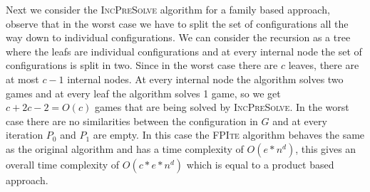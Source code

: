 Next we consider the \textsc{IncPreSolve} algorithm for a family based approach, observe that in the worst case we have to split the set of configurations all the way down to individual configurations. We can consider the recursion as a tree where the leafs are individual configurations and at every internal node the set of configurations is split in two. Since in the worst case there are $c$ leaves, there are at most $c-1$ internal nodes. At every internal node the algorithm solves two games and at every leaf the algorithm solves 1 game, so we get $c + 2c - 2 = O(c)$ games that are being solved by \textsc{IncPreSolve}. In the worst case there are no similarities between the configuration in $G$ and at every iteration $P_0$ and $P_1$ are empty. In this case the \textsc{FPIte} algorithm behaves the same as the original algorithm and has a time complexity of $O(e*n^d)$, this gives an overall time complexity of $O(c*e*n^d)$ which is equal to a product based approach.